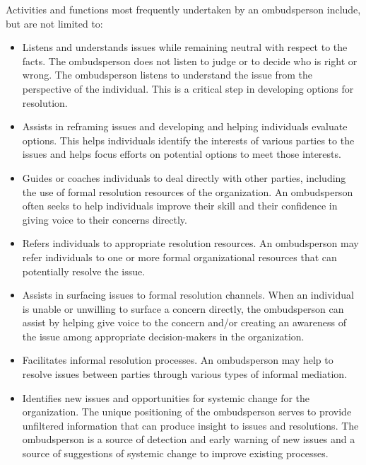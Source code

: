 \documentclass[12pt]{article}
\begin{document}
Activities and functions most frequently undertaken by an ombudsperson include, but are not limited to:
\begin{itemize}
\item Listens and understands issues while remaining neutral with respect to the facts. The ombudsperson does not listen to judge or to decide who is right or wrong. The ombudsperson listens to understand the issue from the perspective of the individual. This is a critical step in developing options for resolution.
\item Assists in reframing issues and developing and helping individuals evaluate options. This helps individuals identify the interests of various parties to the issues and helps focus efforts on potential options to meet those interests.
\item Guides or coaches individuals to deal directly with other parties, including the use of formal resolution resources of the organization. An ombudsperson often seeks to help individuals improve their skill and their confidence in giving voice to their concerns directly.
\item Refers individuals to appropriate resolution resources. An ombudsperson may refer individuals to one or more formal organizational resources that can potentially resolve the issue.
\item Assists in surfacing issues to formal resolution channels. When an individual is unable or unwilling to surface a concern directly, the ombudsperson can assist by helping give voice to the concern and/or creating an awareness of the issue among appropriate decision-makers in the organization.
\item Facilitates informal resolution processes. An ombudsperson may help to resolve issues between parties through various types of informal mediation.
\item Identifies new issues and opportunities for systemic change for the organization. The unique positioning of the ombudsperson serves to provide unfiltered information that can produce insight to issues and resolutions. The ombudsperson is a source of detection and early warning of new issues and a source of suggestions of systemic change to improve existing processes.
\end{itemize}
\end{document}
